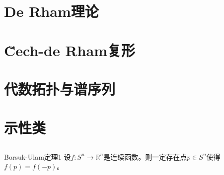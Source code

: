 \documentclass{package/fancy-book}
\begin{document}

\tableofcontents

\quad


\chapter{De Rham理论}
\section{}
\begin{proposition}{}
   
\end{proposition}
\chapter{\u{C}ech-de Rham复形}

\chapter{代数拓扑与谱序列}

\chapter{示性类}
\section{}
\begin{theorem}{Borsuk-Ulam定理1}
    设$f:S^n \to \mathbb{R}^n$是连续函数。则一定存在点$p \in S^n$使得$f(p)=f(-p)$。
\end{theorem}
\end{document}
